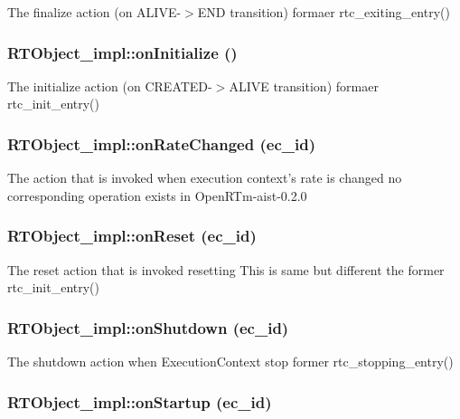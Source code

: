 The finalize action (on ALIVE-$>$END transition) formaer rtc\_\-exiting\_\-entry()
\subsubsection{\setlength{\rightskip}{0pt plus 5cm}RTObject\_\-impl::on\-Initialize ()}\label{classRTObject__impl_RTObject__impla1}


The initialize action (on CREATED-$>$ALIVE transition) formaer rtc\_\-init\_\-entry()
\subsubsection{\setlength{\rightskip}{0pt plus 5cm}RTObject\_\-impl::on\-Rate\-Changed (ec\_\-id)}\label{classRTObject__impl_RTObject__impla12}


The action that is invoked when execution context's rate is changed no corresponding operation exists in Open\-RTm-aist-0.2.0
\subsubsection{\setlength{\rightskip}{0pt plus 5cm}RTObject\_\-impl::on\-Reset (ec\_\-id)}\label{classRTObject__impl_RTObject__impla10}


The reset action that is invoked resetting This is same but different the former rtc\_\-init\_\-entry()
\subsubsection{\setlength{\rightskip}{0pt plus 5cm}RTObject\_\-impl::on\-Shutdown (ec\_\-id)}\label{classRTObject__impl_RTObject__impla4}


The shutdown action when Execution\-Context stop former rtc\_\-stopping\_\-entry()
\subsubsection{\setlength{\rightskip}{0pt plus 5cm}RTObject\_\-impl::on\-Startup (ec\_\-id)}\label{classRTObject__impl_RTObject__impla3}



